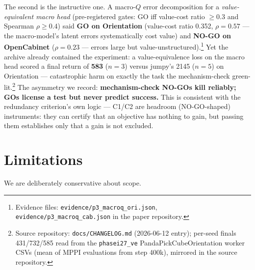\documentclass{article}
\begin{document}
The second is the instructive one. A macro-$Q$ error decomposition for a \emph{value-equivalent macro head} (pre-registered gates: GO iff value-cost ratio $\geq 0.3$ and Spearman $\rho \geq 0.4$) said \textbf{GO on Orientation} (value-cost ratio 0.352, $\rho = 0.57$ --- the macro-model's latent errors systematically cost value) and \textbf{NO-GO on OpenCabinet} ($\rho = 0.23$ --- errors large but value-unstructured).\footnote{Evidence files: \texttt{evidence/p3\_macroq\_ori.json}, \texttt{evidence/p3\_macroq\_cab.json} in the paper repository.} Yet the archive already contained the experiment: a value-equivalence loss on the macro head scored a final return of \textbf{583} ($n{=}3$) versus jumpy's 2145 ($n{=}5$) on Orientation --- catastrophic harm on exactly the task the mechanism-check green-lit.\footnote{Source repository: \texttt{docs/CHANGELOG.md} (2026-06-12 entry); per-seed finals 431/732/585 read from the \texttt{phasei27\_ve} PandaPickCubeOrientation worker CSVs (mean of MPPI evaluations from step 400k), mirrored in the source repository.} The asymmetry we record: \textbf{mechanism-check NO-GOs kill reliably; GOs license a test but never predict success.} This is consistent with the redundancy criterion's own logic --- C1/C2 are headroom (NO-GO-shaped) instruments: they can certify that an objective has nothing to gain, but passing them establishes only that a gain is not excluded.

\section{Limitations}
\label{sec:limitations}

We are deliberately conservative about scope.
\end{document}
